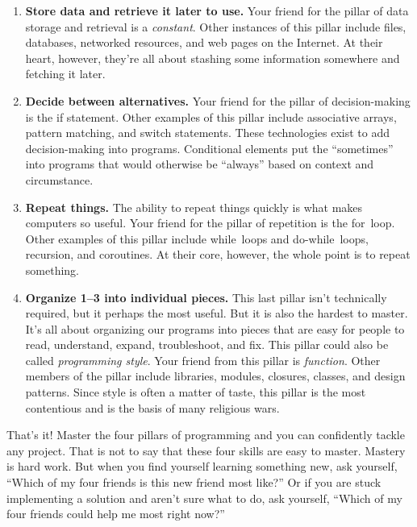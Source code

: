 \documentclass{amsart}
\begin{document}
\begin{enumerate}
  \item \textbf{Store data and retrieve it later to use.}
  Your friend for the pillar of data storage and retrieval is a \emph{constant}. Other instances of this pillar include files, databases, networked resources, and web pages on the Internet. At their heart, however, they're all about stashing some information somewhere and fetching it later.

  \item \textbf{Decide between alternatives.}
  Your friend for the pillar of decision-making is the \textsf{if} statement. Other examples of this pillar include associative arrays, pattern matching, and \textsf{switch} statements. These technologies exist to add decision-making into programs. Conditional elements put the ``sometimes'' into programs that would otherwise be ``always'' based on context and circumstance.

  \item \textbf{Repeat things.}
  The ability to repeat things quickly is what makes computers so useful. Your friend for the pillar of repetition is the \textsf{for}~loop. Other examples of this pillar include \textsf{while}~loops and \textsf{do-while}~loops, recursion, and coroutines. At their core, however, the whole point is to repeat something.

  \item \textbf{Organize 1--3 into individual pieces.}
  This last pillar isn't technically required, but it perhaps the most useful. But it is also the hardest to master. It's all about organizing our programs into pieces that are easy for people to read, understand, expand, troubleshoot, and fix. This pillar could also be called \emph{programming style}. Your friend from this pillar is \emph{function}. Other members of the pillar include libraries, modules, closures, classes, and design patterns. Since style is often a matter of taste, this pillar is the most contentious and is the basis of many religious wars.
\end{enumerate}

That's it! Master the four pillars of programming and you can confidently tackle any project. That is not to say that these four skills are easy to master. Mastery is hard work. But when you find yourself learning something new, ask yourself, ``Which of my four friends is this new friend most like?'' Or if you are stuck implementing a solution and aren't sure what to do, ask yourself, ``Which of my four friends could help me most right now?''
\end{document}
